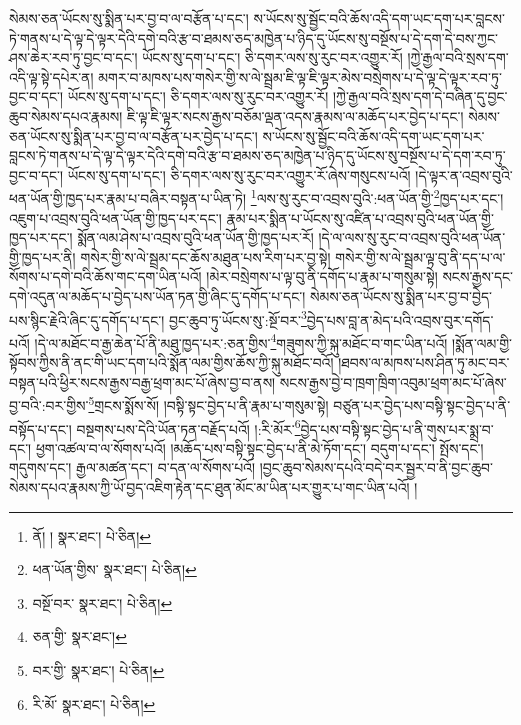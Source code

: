 སེམས་ཅན་ཡོངས་སུ་སྨིན་པར་བྱ་བ་ལ་བརྩོན་པ་དང་། ས་ཡོངས་སུ་སྦྱོང་བའི་ཆོས་འདི་དག་ཡང་དག་པར་བླངས་ཏེ་གནས་པ་དེ་ལྟ་དེ་ལྟར་དེའི་དགེ་བའི་རྩ་བ་ཐམས་ཅད་མཁྱེན་པ་ཉིད་དུ་ཡོངས་སུ་བསྔོས་པ་དེ་དག་དེ་བས་ཀྱང་ཤས་ཆེར་རབ་ཏུ་བྱང་བ་དང་། ཡོངས་སུ་དག་པ་དང་། ཅི་དགར་ལས་སུ་རུང་བར་འགྱུར་རོ། །ཀྱེ་རྒྱལ་བའི་སྲས་དག་འདི་ལྟ་སྟེ་དཔེར་ན། མགར་བ་མཁས་པས་གསེར་གྱི་ས་ལེ་སྦྲམ་ཇི་ལྟ་ཇི་ལྟར་མེས་བསྲེགས་པ་དེ་ལྟ་དེ་ལྟར་རབ་ཏུ་བྱང་བ་དང་། ཡོངས་སུ་དག་པ་དང་། ཅི་དགར་ལས་སུ་རུང་བར་འགྱུར་རོ། །ཀྱེ་རྒྱལ་བའི་སྲས་དག་དེ་བཞིན་དུ་བྱང་ཆུབ་སེམས་དཔའ་རྣམས། ཇི་ལྟ་ཇི་ལྟར་སངས་རྒྱས་བཅོམ་ལྡན་འདས་རྣམས་ལ་མཆོད་པར་བྱེད་པ་དང་། སེམས་ཅན་ཡོངས་སུ་སྨིན་པར་བྱ་བ་ལ་བརྩོན་པར་བྱེད་པ་དང་། ས་ཡོངས་སུ་སྦྱོང་བའི་ཆོས་འདི་དག་ཡང་དག་པར་བླངས་ཏེ་གནས་པ་དེ་ལྟ་དེ་ལྟར་དེའི་དགེ་བའི་རྩ་བ་ཐམས་ཅད་མཁྱེན་པ་ཉིད་དུ་ཡོངས་སུ་བསྔོས་པ་དེ་དག་རབ་ཏུ་བྱང་བ་དང་། ཡོངས་སུ་དག་པ་དང་། ཅི་དགར་ལས་སུ་རུང་བར་འགྱུར་རོ་ཞེས་གསུངས་པའོ། །དེ་ལྟར་ན་འབྲས་བུའི་ཕན་ཡོན་གྱི་ཁྱད་པར་རྣམ་པ་བཞིར་བསྟན་པ་ཡིན་ཏེ། \footnote{ནོ། །   སྣར་ཐང་།  པེ་ཅིན། }ལས་སུ་རུང་བ་འབྲས་བུའི་:ཕན་ཡོན་གྱི་\footnote{ཕན་ཡོན་གྱིས་  སྣར་ཐང་།  པེ་ཅིན། }ཁྱད་པར་དང་། འཇུག་པ་འབྲས་བུའི་ཕན་ཡོན་གྱི་ཁྱད་པར་དང་། རྣམ་པར་སྨིན་པ་ཡོངས་སུ་འཛིན་པ་འབྲས་བུའི་ཕན་ཡོན་གྱི་ཁྱད་པར་དང་། སྨོན་ལམ་ཤེས་པ་འབྲས་བུའི་ཕན་ཡོན་གྱི་ཁྱད་པར་རོ། །དེ་ལ་ལས་སུ་རུང་བ་འབྲས་བུའི་ཕན་ཡོན་གྱི་ཁྱད་པར་ནི། གསེར་གྱི་ས་ལེ་སྦྲམ་དང་ཆོས་མཐུན་པས་རིག་པར་བྱ་སྟེ། གསེར་གྱི་ས་ལེ་སྦྲམ་ལྟ་བུ་ནི་དད་པ་ལ་སོགས་པ་དགེ་བའི་ཆོས་གང་དག་ཡིན་པའོ། །མེར་བསྲེགས་པ་ལྟ་བུ་ནི་དགོད་པ་རྣམ་པ་གསུམ་སྟེ། སངས་རྒྱས་དང་དགེ་འདུན་ལ་མཆོད་པ་བྱེད་པས་ཡོན་ཏན་གྱི་ཞིང་དུ་དགོད་པ་དང་། སེམས་ཅན་ཡོངས་སུ་སྨིན་པར་བྱ་བ་བྱེད་པས་སྙིང་རྗེའི་ཞིང་དུ་དགོད་པ་དང་། བྱང་ཆུབ་ཏུ་ཡོངས་སུ་:སྔོ་བར་\footnote{བསྔོ་བར་  སྣར་ཐང་།  པེ་ཅིན། }བྱེད་པས་བླ་ན་མེད་པའི་འབྲས་བུར་དགོད་པའོ། །དེ་ལ་མཐོང་བ་རྒྱ་ཆེན་པོ་ནི་མཐུ་ཁྱད་པར་:ཅན་གྱིས་\footnote{ཅན་གྱི་  སྣར་ཐང་། }གཟུགས་ཀྱི་སྐུ་མཐོང་བ་གང་ཡིན་པའོ། །སྨོན་ལམ་གྱི་སྟོབས་ཀྱིས་ནི་ནང་གི་ཡང་དག་པའི་སྨོན་ལམ་གྱིས་ཆོས་ཀྱི་སྐུ་མཐོང་བའོ། །ཐབས་ལ་མཁས་པས་ཤིན་ཏུ་མང་བར་བསྟན་པའི་ཕྱིར་སངས་རྒྱས་བརྒྱ་ཕྲག་མང་པོ་ཞེས་བྱ་བ་ནས། སངས་རྒྱས་བྱེ་བ་ཁྲག་ཁྲིག་འབུམ་ཕྲག་མང་པོ་ཞེས་བྱ་བའི་:བར་གྱིས་\footnote{བར་གྱི་  སྣར་ཐང་།  པེ་ཅིན། }གྲངས་སྨོས་སོ། །བསྟི་སྟང་བྱེད་པ་ནི་རྣམ་པ་གསུམ་སྟེ། བཙུན་པར་བྱེད་པས་བསྟི་སྟང་བྱེད་པ་ནི་བསྟོད་པ་དང་། བསྔགས་པས་དེའི་ཡོན་ཏན་བརྗོད་པའོ། །:རི་མོར་\footnote{རི་མོ་  སྣར་ཐང་།  པེ་ཅིན། }བྱེད་པས་བསྟི་སྟང་བྱེད་པ་ནི་གུས་པར་སྨྲ་བ་དང་། ཕྱག་འཚལ་བ་ལ་སོགས་པའོ། །མཆོད་པས་བསྟི་སྟང་བྱེད་པ་ནི་མེ་ཏོག་དང་། བདུག་པ་དང་། སྤོས་དང་། གདུགས་དང་། རྒྱལ་མཚན་དང་། བ་དན་ལ་སོགས་པའོ། །བྱང་ཆུབ་སེམས་དཔའི་བདེ་བར་སྦྱར་བ་ནི་བྱང་ཆུབ་སེམས་དཔའ་རྣམས་ཀྱི་ཡོ་བྱད་འཇིག་རྟེན་དང་ཐུན་མོང་མ་ཡིན་པར་གྱུར་པ་གང་ཡིན་པའོ། །
